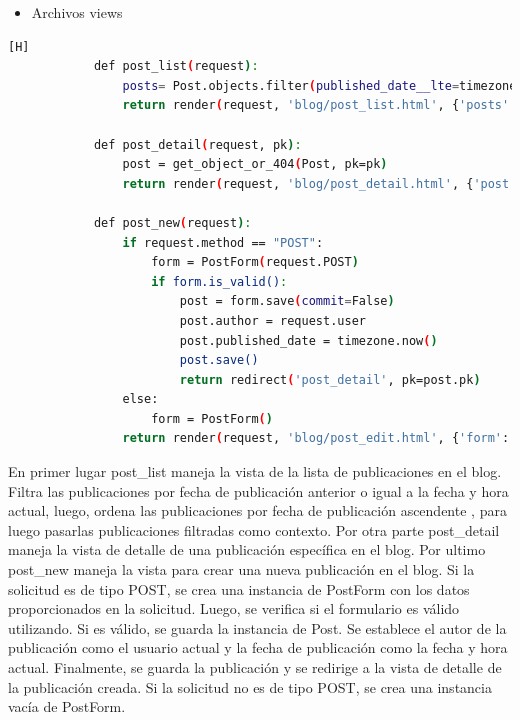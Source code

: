 \documentclass{article}
\begin{document}
	\begin{itemize}	
		\item Archivos views
	\end{itemize}
	\begin{lstlisting}[language=bash,caption={Primer parte de views.py}][H]
            def post_list(request):
                posts= Post.objects.filter(published_date__lte=timezone.now()).order_by('published_date')
                return render(request, 'blog/post_list.html', {'posts': posts})
            
            def post_detail(request, pk):
                post = get_object_or_404(Post, pk=pk)
                return render(request, 'blog/post_detail.html', {'post': post})
            
            def post_new(request):
                if request.method == "POST":
                    form = PostForm(request.POST)
                    if form.is_valid():
                        post = form.save(commit=False)
                        post.author = request.user
                        post.published_date = timezone.now()
                        post.save()
                        return redirect('post_detail', pk=post.pk)
                else:
                    form = PostForm()
                return render(request, 'blog/post_edit.html', {'form': form})
	\end{lstlisting}
        En primer lugar post\_list  maneja la vista de la lista de publicaciones en el blog. Filtra las publicaciones por fecha de publicación anterior o igual a la fecha y hora actual, luego, ordena las publicaciones por fecha de publicación ascendente , para luego pasarlas publicaciones filtradas como contexto.
        Por otra parte post\_detail maneja la vista de detalle de una publicación específica en el blog. Por ultimo post\_new maneja la vista para crear una nueva publicación en el blog. Si la solicitud es de tipo POST, se crea una instancia de PostForm con los datos proporcionados en la solicitud. Luego, se verifica si el formulario es válido utilizando. Si es válido, se guarda la instancia de Post. Se establece el autor de la publicación como el usuario actual  y la fecha de publicación como la fecha y hora actual. Finalmente, se guarda la publicación y se redirige a la vista de detalle de la publicación creada. Si la solicitud no es de tipo POST, se crea una instancia vacía de PostForm.
\end{document}
